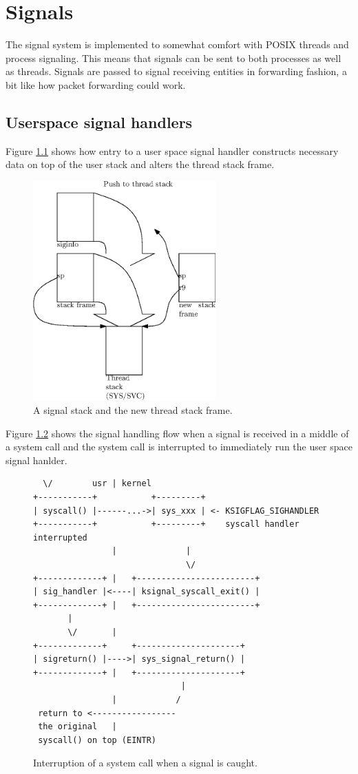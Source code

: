 \chapter{Signals}

The signal system is implemented to somewhat comfort with \acs{POSIX} threads
and process signaling. This means that signals can be sent to both processes as
well as threads. Signals are passed to signal receiving entities in forwarding
fashion, a bit like how packet forwarding could work.

\section{Userspace signal handlers}

Figure \ref{figure:sigstack} shows how entry to a user space signal handler
constructs necessary data on top of the user stack and alters the thread
stack frame.

\begin{figure}
  \center
  \includegraphics[width=7cm]{pics/signal_stack}
  \caption{A signal stack and the new thread stack frame.}
  \label{figure:sigstack}
\end{figure}

Figure \ref{figure:syscallint} shows the signal handling flow when
a signal is received in a middle of a system call and the system call
is interrupted to immediately run the user space signal hanlder.

\begin{figure}
\begin{verbatim}
  \/        usr | kernel
+-----------+           +---------+
| syscall() |------...->| sys_xxx | <- KSIGFLAG_SIGHANDLER
+-----------+           +---------+    syscall handler interrupted
                |              |
                               \/
+-------------+ |   +------------------------+
| sig_handler |<----| ksignal_syscall_exit() |  
+-------------+ |   +------------------------+
       |
       \/       |
+-------------+     +---------------------+
| sigreturn() |---->| sys_signal_return() |
+-------------+ |   +---------------------+
                              |
                |            /
 return to <-----------------
 the original   |
 syscall() on top (EINTR)
\end{verbatim}
\caption{Interruption of a system call when a signal is caught.}
\label{figure:syscallint}
\end{figure}
